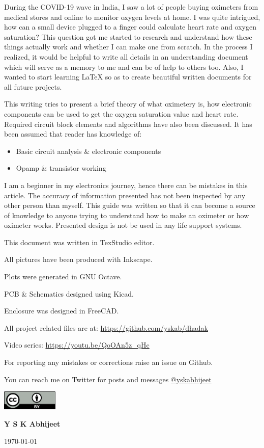 During the COVID-19 wave in India, I saw a lot of people buying oximeters from medical stores and online to monitor oxygen levels at home. I was quite intrigued, how can a small device plugged to a finger could calculate heart rate and oxygen saturation? This question got me started to research and understand how these things actually work and whether I can make one from scratch. In the process I realized, it would be helpful to write all details in an understanding document which will serve as a memory to me and can be of help to others too.
Also, I wanted to start learning \LaTeX \hspace{1pt} so as to create beautiful written documents for all future projects.\medskip

This writing tries to present a brief theory of what oximetery is, how electronic components can be used to get the oxygen saturation value and heart rate. Required circuit block elements and algorithms have also been discussed. It has been assumed that reader has knowledge of:

\begin{itemize}
	\item Basic circuit analysis \& electronic components
	\item Opamp \& transistor working
\end{itemize}

\bigskip

I am a beginner in my electronics journey, hence there can be mistakes in this article. The accuracy of information presented has not been inspected by any other person than myself.
This guide was written so that it can become a source of knowledge to anyone trying to understand how to make an oximeter or how oximeter works. Presented design is not be used in any life support systems.

\bigskip
This document was written in TexStudio editor.

All pictures have been produced with Inkscape.

Plots were generated in GNU Octave.

PCB \& Schematics designed using Kicad.

Enclosure was designed in FreeCAD.

\medskip
All project related files are at: \url{https://github.com/yskab/dhadak}

Video series: \url{https://youtu.be/QoOAn5z_qHc}

For reporting any mistakes or corrections raise an issue on Github.

You can reach me on Twitter for posts and messages \href{https://twitter.com/yskabhijeet}{@yskabhijeet}

\includegraphics[width=0.2\textwidth]{../common/cc.png}\par

\vfill
\hfill
{\Large\bfseries Y S K Abhijeet}\par
\hfill
\large \today

